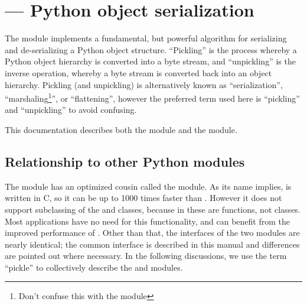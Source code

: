 \section{ --- Python object serialization}



The  module implements a fundamental, but powerful
algorithm for serializing and de-serializing a Python object
structure.  ``Pickling'' is the process whereby a Python object
hierarchy is converted into a byte stream, and ``unpickling'' is the
inverse operation, whereby a byte stream is converted back into an
object hierarchy.  Pickling (and unpickling) is alternatively known as
``serialization'', ``marshaling\footnote{Don't confuse this with the
 module}'', or ``flattening'',
however the preferred term used here is ``pickling'' and
``unpickling'' to avoid confusing.

This documentation describes both the  module and the 
 module.

\subsection{Relationship to other Python modules}

The  module has an optimized cousin called the
 module.  As its name implies,  is
written in C, so it can be up to 1000 times faster than
.  However it does not support subclassing of the
 and  classes, because in
 these are functions, not classes.  Most applications
have no need for this functionality, and can benefit from the improved
performance of .  Other than that, the interfaces of
the two modules are nearly identical; the common interface is
described in this manual and differences are pointed out where
necessary.  In the following discussions, we use the term ``pickle''
to collectively describe the  and
 modules.

